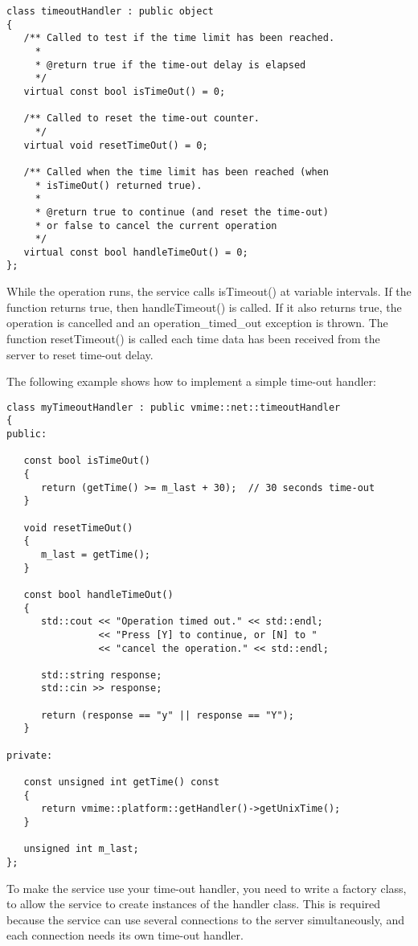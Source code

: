 \begin{lstlisting}
class timeoutHandler : public object
{
   /** Called to test if the time limit has been reached.
     *
     * @return true if the time-out delay is elapsed
     */
   virtual const bool isTimeOut() = 0;

   /** Called to reset the time-out counter.
     */
   virtual void resetTimeOut() = 0;

   /** Called when the time limit has been reached (when
     * isTimeOut() returned true).
     *
     * @return true to continue (and reset the time-out)
     * or false to cancel the current operation
     */
   virtual const bool handleTimeOut() = 0;
};
\end{lstlisting}

While the operation runs, the service calls {\vcode isTimeout()} at variable
intervals. If the function returns {\vcode true}, then
{\vcode handleTimeout()} is called. If it also returns {\vcode true}, the
operation is cancelled and an {\vcode operation\_timed\_out} exception is
thrown. The function {\vcode resetTimeout()} is called each time data has
been received from the server to reset time-out delay.

The following example shows how to implement a simple time-out handler:

\begin{lstlisting}[caption={Implementing a simple time-out handler}]
class myTimeoutHandler : public vmime::net::timeoutHandler
{
public:

   const bool isTimeOut()
   {
      return (getTime() >= m_last + 30);  // 30 seconds time-out
   }

   void resetTimeOut()
   {
      m_last = getTime();
   }

   const bool handleTimeOut()
   {
      std::cout << "Operation timed out." << std::endl;
                << "Press [Y] to continue, or [N] to "
                << "cancel the operation." << std::endl;

      std::string response;
      std::cin >> response;

      return (response == "y" || response == "Y");
   }

private:

   const unsigned int getTime() const
   {
      return vmime::platform::getHandler()->getUnixTime();
   }

   unsigned int m_last;
};
\end{lstlisting}

To make the service use your time-out handler, you need to write a factory
class, to allow the service to create instances of the handler class. This
is required because the service can use several connections to the server
simultaneously, and each connection needs its own time-out handler.

